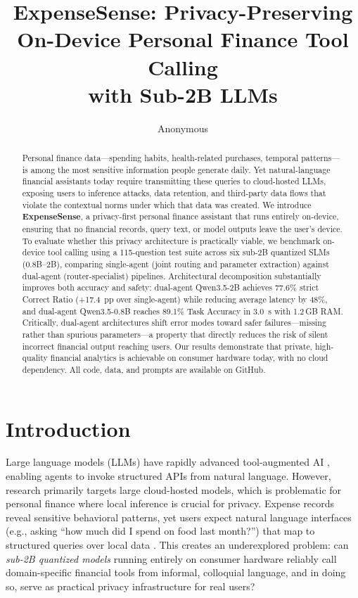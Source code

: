 \documentclass[11pt,twocolumn]{article}
\title{ExpenseSense: Privacy-Preserving On-Device Personal Finance Tool Calling \\ with Sub-2B LLMs}
\author{Anonymous}
\begin{document}
\maketitle

\begin{abstract}
Personal finance data---spending habits, health-related purchases,
temporal patterns---is among the most sensitive information people
generate daily.
Yet natural-language financial assistants today require transmitting
these queries to cloud-hosted LLMs, exposing users to inference
attacks, data retention, and third-party data flows that violate the
contextual norms under which that data was created.
We introduce \textbf{ExpenseSense}, a privacy-first personal finance
assistant that runs entirely on-device, ensuring that no financial
records, query text, or model outputs leave the user's device.
To evaluate whether this privacy architecture is practically viable,
we benchmark on-device tool calling using a 115-question test suite
across six sub-2B quantized SLMs (0.8B--2B), comparing single-agent
(joint routing and parameter extraction) against dual-agent
(router-specialist) pipelines.
Architectural decomposition substantially improves both accuracy and
safety: dual-agent Qwen3.5-2B achieves 77.6\% strict Correct Ratio
(+17.4~pp over single-agent) while reducing average latency by 48\%,
and dual-agent Qwen3.5-0.8B reaches 89.1\% Task Accuracy in 3.0~s
with 1.2\,GB RAM.
Critically, dual-agent architectures shift error modes toward safer
failures---missing rather than spurious parameters---a property that
directly reduces the risk of silent incorrect financial output
reaching users.
Our results demonstrate that private, high-quality financial analytics
is achievable on consumer hardware today, with no cloud dependency.
All code, data, and prompts are available on GitHub.
\end{abstract}

\section{Introduction}

Large language models (LLMs) have rapidly advanced tool-augmented AI
\citep{schick2024toolformer, patil2023gorilla, qin2023toolllm},
enabling agents to invoke structured APIs from natural language.
However, research primarily targets large cloud-hosted models, which
is problematic for personal finance where local inference is crucial
for privacy.
Expense records reveal sensitive behavioral patterns, yet users expect
natural language interfaces (e.g., asking ``how much did I spend on
food last month?'') that map to structured queries over local data
\citep{li2024personal}.
This creates an underexplored problem: can \emph{sub-2B quantized
models} running entirely on consumer hardware reliably call
domain-specific financial tools from informal, colloquial language,
and in doing so, serve as practical privacy infrastructure for real
users?
\end{document}
